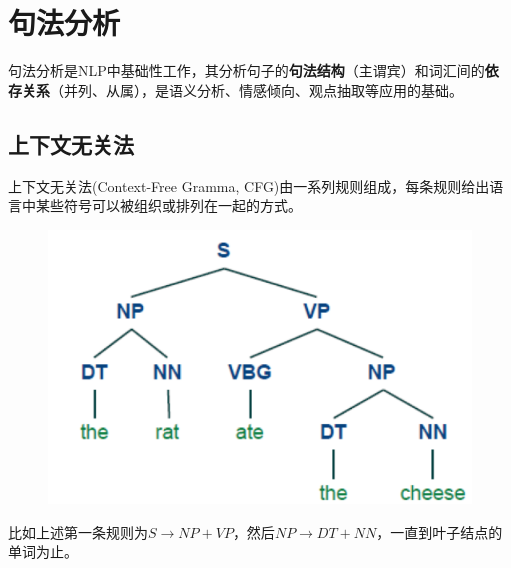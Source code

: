 
\section{句法分析}
句法分析是NLP中基础性工作，其分析句子的\textbf{句法结构}（主谓宾）和词汇间的\textbf{依存关系}（并列、从属），是语义分析、情感倾向、观点抽取等应用的基础。

\subsection{上下文无关法}
上下文无关法(Context-Free Gramma, CFG)由一系列规则组成，每条规则给出语言中某些符号可以被组织或排列在一起的方式。
\begin{figure}[H]
\centering
\includegraphics[width=0.4\linewidth]{fig/CFG.png}
\end{figure}
比如上述第一条规则为$S\to NP+VP$，然后$NP\to DT+NN$，一直到叶子结点的单词为止。

